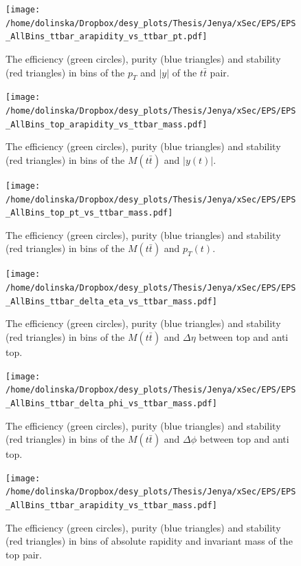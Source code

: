 \begin{figure}[p]
  \centering
  \texttt{[image: /home/dolinska/Dropbox/desy\_plots/Thesis/Jenya/xSec/EPS/EPS\_AllBins\_ttbar\_arapidity\_vs\_ttbar\_pt.pdf]}
  \caption{The efficiency (green circles), purity (blue triangles) and stability (red triangles) in bins of the $p_{T}$ and $|y|$ of the $t\bar{t}$ pair.}
  \label{fig:EPS_2D_ptt_ytt}
\end{figure}

\begin{figure}[p]
  \centering
  \texttt{[image: /home/dolinska/Dropbox/desy\_plots/Thesis/Jenya/xSec/EPS/EPS\_AllBins\_top\_arapidity\_vs\_ttbar\_mass.pdf]}
  \caption{The efficiency (green circles), purity (blue triangles) and stability (red triangles) in bins of the $M(t\bar{t})$ and $|y(t)|$.}
  \label{fig:EPS_2D_Mtt_yt}
\end{figure}

\begin{figure}[p]
  \centering
  \texttt{[image: /home/dolinska/Dropbox/desy\_plots/Thesis/Jenya/xSec/EPS/EPS\_AllBins\_top\_pt\_vs\_ttbar\_mass.pdf]}
  \caption{The efficiency (green circles), purity (blue triangles) and stability (red triangles) in bins of the $M(t\bar{t})$ and $p_{T}(t)$.}
  \label{fig:EPS_2D_Mtt_pt}
\end{figure}

\begin{figure}[p]
  \centering
  \texttt{[image: /home/dolinska/Dropbox/desy\_plots/Thesis/Jenya/xSec/EPS/EPS\_AllBins\_ttbar\_delta\_eta\_vs\_ttbar\_mass.pdf]}
  \caption{The efficiency (green circles), purity (blue triangles) and stability (red triangles) in bins of the $M(t\bar{t})$ and $\Delta\eta$ between top and anti top.}
  \label{fig:EPS_2D_Mtt_eta}
\end{figure}

\begin{figure}[p]
  \centering
  \texttt{[image: /home/dolinska/Dropbox/desy\_plots/Thesis/Jenya/xSec/EPS/EPS\_AllBins\_ttbar\_delta\_phi\_vs\_ttbar\_mass.pdf]}
  \caption{The efficiency (green circles), purity (blue triangles) and stability (red triangles) in bins of the $M(t\bar{t})$ and $\Delta\phi$ between top and anti top.}
  \label{fig:EPS_2D_Mtt_phi}
\end{figure}

\begin{figure}[p]
  \centering
  \texttt{[image: /home/dolinska/Dropbox/desy\_plots/Thesis/Jenya/xSec/EPS/EPS\_AllBins\_ttbar\_arapidity\_vs\_ttbar\_mass.pdf]}
  \caption{The efficiency (green circles), purity (blue triangles) and stability (red triangles) in bins of absolute rapidity and invariant mass of the top pair.}
  \label{fig:EPS_2D_ytt_Mtt}
\end{figure}

